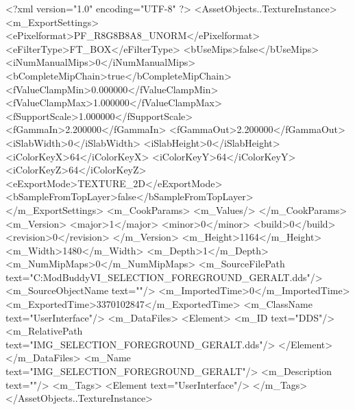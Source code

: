 <?xml version="1.0" encoding="UTF-8" ?>
<AssetObjects..TextureInstance>
	<m_ExportSettings>
		<ePixelformat>PF_R8G8B8A8_UNORM</ePixelformat>
		<eFilterType>FT_BOX</eFilterType>
		<bUseMips>false</bUseMips>
		<iNumManualMips>0</iNumManualMips>
		<bCompleteMipChain>true</bCompleteMipChain>
		<fValueClampMin>0.000000</fValueClampMin>
		<fValueClampMax>1.000000</fValueClampMax>
		<fSupportScale>1.000000</fSupportScale>
		<fGammaIn>2.200000</fGammaIn>
		<fGammaOut>2.200000</fGammaOut>
		<iSlabWidth>0</iSlabWidth>
		<iSlabHeight>0</iSlabHeight>
		<iColorKeyX>64</iColorKeyX>
		<iColorKeyY>64</iColorKeyY>
		<iColorKeyZ>64</iColorKeyZ>
		<eExportMode>TEXTURE_2D</eExportMode>
		<bSampleFromTopLayer>false</bSampleFromTopLayer>
	</m_ExportSettings>
	<m_CookParams>
		<m_Values/>
	</m_CookParams>
	<m_Version>
		<major>1</major>
		<minor>0</minor>
		<build>0</build>
		<revision>0</revision>
	</m_Version>
	<m_Height>1164</m_Height>
	<m_Width>1480</m_Width>
	<m_Depth>1</m_Depth>
	<m_NumMipMaps>0</m_NumMipMaps>
	<m_SourceFilePath text="C:\Users\asus\Documents\Firaxis ModBuddy\Civilization VI\temppic\IMG_SELECTION_FOREGROUND_GERALT.dds"/>
	<m_SourceObjectName text=""/>
	<m_ImportedTime>0</m_ImportedTime>
	<m_ExportedTime>3370102847</m_ExportedTime>
	<m_ClassName text="UserInterface"/>
	<m_DataFiles>
		<Element>
			<m_ID text="DDS"/>
			<m_RelativePath text="IMG_SELECTION_FOREGROUND_GERALT.dds"/>
		</Element>
	</m_DataFiles>
	<m_Name text="IMG_SELECTION_FOREGROUND_GERALT"/>
	<m_Description text=""/>
	<m_Tags>
		<Element text="UserInterface"/>
	</m_Tags>
</AssetObjects..TextureInstance>

